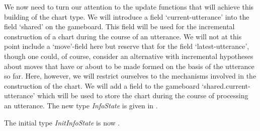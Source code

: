 We now need to turn our attention to the update functions that will
achieve this building of the chart type.  We will introduce a field
`current-utterance' into the field `shared' on the gameboard.  This
field will be used for the incremental construction of a chart during
the course of an utterance.  We will not at this point include a
`move'-field here but reserve that for the field `latest-utterance',
though one could, of course, consider an alternative with incremental hypotheses about
moves that have or about to be made formed on the basis of the
utterance so far.  Here, however, we will restrict ourselves to the
mechanisms involved in the construction of the chart.  We will add a
field to the gameboard `shared.current-utterance' which will be used
to store the chart during the course of processing an utterance.  The
new type \textit{InfoState} is given in \nexteg{}.
\begin{ex} 
\end{ex}
The initial type \textit{InitInfoState} is now \nexteg{}.
\begin{ex} 
\end{ex} 

